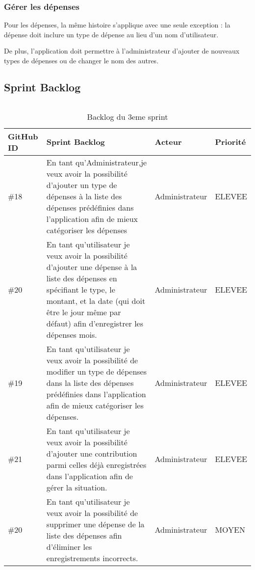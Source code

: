 \subsubsection{Gérer les dépenses}
Pour les dépenses, la même histoire s'applique avec une seule exception : la dépense doit inclure un type de dépense au lieu d'un nom d'utilisateur.

De plus, l'application doit permettre à l'administrateur d'ajouter de nouveaux types de dépenses ou de changer le nom des autres.

\subsection{Sprint Backlog}
$  $
\begin{center}
  \begin{table}[h!]
  \begin{tabular}{ | m{2cm} | m{7cm}| m{3cm} | m{2cm} |} 
   \hline
   GitHub ID & Sprint Backlog & Acteur & Priorité \\ [0.5ex] 
   \hline\hline
   \#18 & En tant qu'Administrateur,je veux avoir la possibilité d'ajouter un type de dépenses à la liste des dépenses prédéfinies dans l'application afin de mieux catégoriser les dépenses& Administrateur & ELEVEE \\ 
   \hline
   \#20  & En tant qu'utilisateur je veux avoir la possibilité d'ajouter une dépense à la liste des dépenses en spécifiant le type, le montant, et la date (qui doit être le jour même par défaut) afin d'enregistrer les dépenses mois. & Administrateur & ELEVEE \\
   \hline
   \#19  & En tant qu'utilisateur je veux avoir la possibilité de modifier un type de dépenses dans la liste des dépenses prédéfinies dans l'application afin de mieux catégoriser les dépenses. & Administrateur & ELEVEE \\
   \hline
   \#21  & En tant qu'utilisateur je veux avoir la possibilité d'ajouter une contribution parmi celles déjà enregistrées dans l'application afin de gérer la situation. & Administrateur & ELEVEE \\
   \hline
   \#20  & En tant qu'utilisateur je veux avoir la possibilité de supprimer une dépense de la liste des dépenses afin d'éliminer les enregistrements incorrects. & Administrateur & MOYEN \\
   \hline
  \end{tabular}
  \caption{Backlog du 3eme sprint}
  \end{table}
\end{center}
